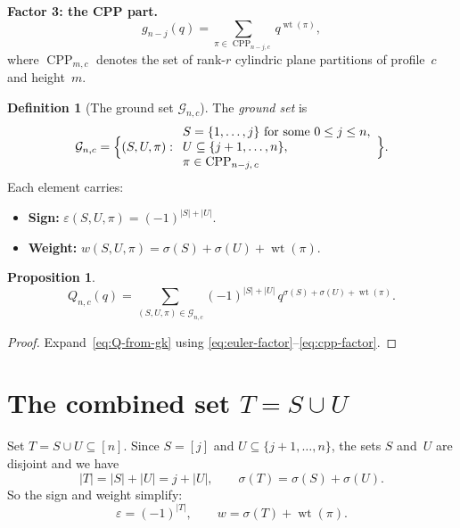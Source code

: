\documentclass[11pt]{article}
\newcommand{\CPP}{\operatorname{CPP}}
\DeclareMathOperator{\wt}{wt}
\theoremstyle{plain}
\newtheorem{proposition}[theorem]{Proposition}
\theoremstyle{definition}
\newtheorem{definition}[theorem]{Definition}
\begin{document}
\medskip\noindent
\textbf{Factor 3: the CPP part.}
\begin{equation}\label{eq:cpp-factor}
  g_{n-j}(q)
  = \sum_{\pi \in \CPP_{n-j, c}} q^{\wt(\pi)},
\end{equation}
where $\CPP_{m,c}$ denotes the set of rank-$r$ cylindric
plane partitions of profile~$c$ and height~$m$.

\begin{definition}[The ground set $\mathcal{G}_{n,c}$]
\label{def:ground-set}
The \emph{ground set} is
\[
  \mathcal{G}_{n,c}
  = \Bigl\{(S, U, \pi)
    : \begin{array}{l}
        S = \{1, \ldots, j\} \text{ for some } 0 \leq j \leq n, \\
        U \subseteq \{j+1, \ldots, n\}, \\
        \pi \in \CPP_{n - j,\, c}
      \end{array}
    \Bigr\}.
\]
Each element carries:
\begin{itemize}
  \item \textbf{Sign:} $\varepsilon(S, U, \pi) = (-1)^{|S| + |U|}$.
  \item \textbf{Weight:} $w(S, U, \pi) = \sigma(S) + \sigma(U) + \wt(\pi)$.
\end{itemize}
\end{definition}

\begin{proposition}\label{prop:ground-set-identity}
\[
  Q_{n,c}(q)
  = \sum_{(S, U, \pi) \in \mathcal{G}_{n,c}}
    (-1)^{|S| + |U|} \, q^{\sigma(S) + \sigma(U) + \wt(\pi)}.
\]
\end{proposition}

\begin{proof}
Expand~\eqref{eq:Q-from-gk} using
\eqref{eq:euler-factor}--\eqref{eq:cpp-factor}.
\end{proof}


\section{The combined set \texorpdfstring{$T = S \cup U$}{T = S ∪ U}}

Set $T = S \cup U \subseteq [n]$.  Since $S = [j]$ and
$U \subseteq \{j+1, \ldots, n\}$, the sets $S$ and~$U$
are disjoint and we have
\[
  |T| = |S| + |U| = j + |U|,
  \qquad
  \sigma(T) = \sigma(S) + \sigma(U).
\]
So the sign and weight simplify:
\[
  \varepsilon = (-1)^{|T|},
  \qquad
  w = \sigma(T) + \wt(\pi).
\]
\end{document}

